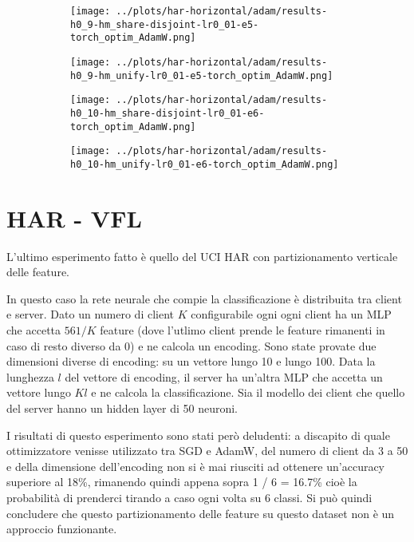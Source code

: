 \begin{figure}[htbp]  %
    \centering
    \begin{subfigure}[b]{0.47\textwidth}
        \centering
        \texttt{[image: ../plots/har-horizontal/adam/results-h0\_9-hm\_share-disjoint-lr0\_01-e5-torch\_optim\_AdamW.png]}
    \end{subfigure}
    \hfill
    \begin{subfigure}[b]{0.47\textwidth}
        \centering
        \texttt{[image: ../plots/har-horizontal/adam/results-h0\_9-hm\_unify-lr0\_01-e5-torch\_optim\_AdamW.png]}
    \end{subfigure}
\end{figure}
\begin{figure}[htbp]  %
    \centering
    \begin{subfigure}[b]{0.47\textwidth}
        \centering
        \texttt{[image: ../plots/har-horizontal/adam/results-h0\_10-hm\_share-disjoint-lr0\_01-e6-torch\_optim\_AdamW.png]}
    \end{subfigure}
    \hfill
    \begin{subfigure}[b]{0.47\textwidth}
        \centering
        \texttt{[image: ../plots/har-horizontal/adam/results-h0\_10-hm\_unify-lr0\_01-e6-torch\_optim\_AdamW.png]}
    \end{subfigure}
\end{figure}


\clearpage
\section{HAR - VFL}
L'ultimo esperimento fatto è quello del UCI HAR con partizionamento 
verticale delle feature.

In questo caso la rete neurale che compie la classificazione è 
distribuita tra client e server. Dato un numero di client \(K\) 
configurabile ogni ogni client ha un MLP che accetta \(561 / K\)
feature (dove l'utlimo client prende le feature rimanenti in caso di 
resto diverso da 0) e ne calcola un encoding. Sono state provate due 
dimensioni diverse di encoding: su un vettore lungo 10 e lungo 100.
Data la lunghezza \(l\) del vettore di encoding, il server ha un'altra 
MLP che accetta un vettore lungo \(Kl\) e ne calcola la classificazione.
Sia il modello dei client che quello del server hanno un hidden layer 
di 50 neuroni.

I risultati di questo esperimento sono stati però deludenti: a discapito
di quale ottimizzatore venisse utilizzato tra SGD e AdamW, del numero di client da 
3 a 50 e della dimensione dell'encoding non si è mai riusciti ad ottenere 
un'accuracy superiore al 18\%, rimanendo quindi appena sopra
1 / 6 = 16.7\% cioè la probabilità di prenderci tirando a caso ogni 
volta su 6 classi. Si può quindi concludere che questo partizionamento
delle feature su questo dataset non è un approccio funzionante.


